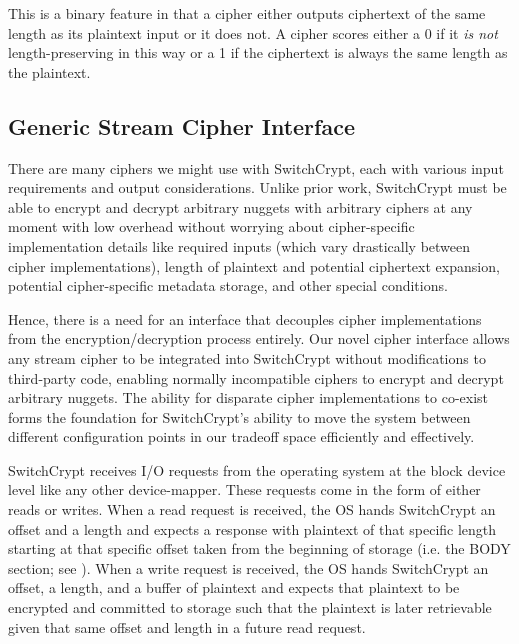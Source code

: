 This is a binary feature in that a cipher either outputs ciphertext of
the same length as its plaintext input or it does not. A cipher scores
either a 0 if it \emph{is not} length-preserving in this way or a 1 if
the ciphertext is always the same length as the plaintext. 

\subsection{Generic Stream Cipher Interface} \label{subsec:interface}

There are many ciphers we might use with SwitchCrypt, each with
various input requirements and output considerations. Unlike prior
work, SwitchCrypt must be able to encrypt and decrypt arbitrary
nuggets with arbitrary ciphers at any moment with low overhead without
worrying about cipher-specific implementation details like required
inputs (which vary drastically between cipher implementations), length
of plaintext and potential ciphertext expansion, potential
cipher-specific metadata storage, and other special conditions.

Hence, there is a need for an interface that decouples cipher implementations
from the encryption/decryption process entirely. Our novel cipher interface
allows any stream cipher to be integrated into SwitchCrypt without modifications
to third-party code, enabling normally incompatible ciphers to encrypt and
decrypt arbitrary nuggets. The ability for disparate cipher implementations to
co-exist forms the foundation for SwitchCrypt's ability to move the system
between different configuration points in our tradeoff space efficiently and
effectively.

SwitchCrypt receives I/O requests from the operating system at the block device
level like any other device-mapper. These requests come in the form of either
reads or writes. When a read request is received, the OS hands SwitchCrypt an
offset and a length and expects a response with plaintext of that specific
length starting at that specific offset taken from the beginning of storage
(i.e. the BODY section; see ). When a write request is
received, the OS hands SwitchCrypt an offset, a length, and a buffer of
plaintext and expects that plaintext to be encrypted and committed to storage
such that the plaintext is later retrievable given that same offset and length
in a future read request. 

